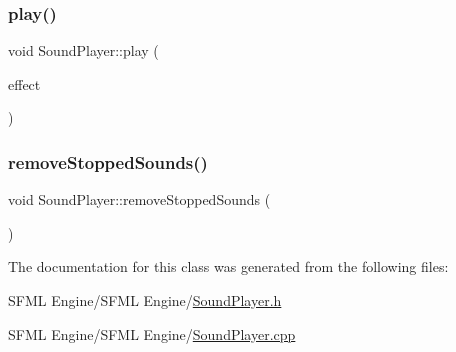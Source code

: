 \hypertarget{class_sound_player_aa0b85f15f5b13bc41c71eeee6b0a7779}{}\label{class_sound_player_aa0b85f15f5b13bc41c71eeee6b0a7779} 
\subsubsection{\texorpdfstring{play()}{play()}}
{\footnotesize\ttfamily void Sound\+Player\+::play (\begin{DoxyParamCaption}\item[{\hyperlink{namespace_sound_effect_a11ffbf1eb89e85a34cbfd5a59b2cd9cb}{Sound\+Effect\+::\+ID}}]{effect }\end{DoxyParamCaption})}

\hypertarget{class_sound_player_a3fd165dadf60b580b16367b81d84681b}{}\label{class_sound_player_a3fd165dadf60b580b16367b81d84681b} 
\subsubsection{\texorpdfstring{remove\+Stopped\+Sounds()}{removeStoppedSounds()}}
{\footnotesize\ttfamily void Sound\+Player\+::remove\+Stopped\+Sounds (\begin{DoxyParamCaption}{ }\end{DoxyParamCaption})}



The documentation for this class was generated from the following files\+:\begin{DoxyCompactItemize}
\item 
S\+F\+M\+L Engine/\+S\+F\+M\+L Engine/\hyperlink{_sound_player_8h}{Sound\+Player.\+h}\item 
S\+F\+M\+L Engine/\+S\+F\+M\+L Engine/\hyperlink{_sound_player_8cpp}{Sound\+Player.\+cpp}\end{DoxyCompactItemize}
